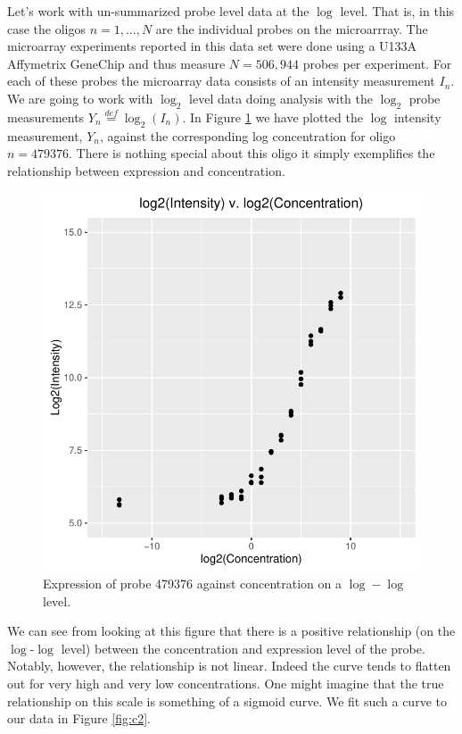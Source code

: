 \documentclass[reqno,12pt,oneside]{report}\usepackage[]{graphicx}\usepackage[]{color}
\makeatletter
\def\maxwidth{ %
  \ifdim\Gin@nat@width>\linewidth
    \linewidth
  \else
    \Gin@nat@width
  \fi
}
\newenvironment{knitrout}{}{} %
\renewenvironment{knitrout}{\begin{small}}{\end{small}}
\theoremstyle{plain}
\theoremstyle{definition}
\theoremstyle{remark}
\numberwithin{theorem}{chapter}     %
\makeatother
\begin{document}
Let's work with un-summarized probe level data at the $\log$ level. That is, in this case the oligos $n=1,\ldots,N$ are the individual probes on the microarrray. The microarray experiments reported in this data set were done using a U133A Affymetrix GeneChip and thus measure $N=506,944$ probes per experiment. For each of these probes the microarray data consists of an intensity measurement $I_n$. We are going to work with $\log_2$ level data doing analysis with the $\log_2$ probe measurements $Y_n \overset{def}{=} \log_2(I_n)$. In Figure \ref{fig:c1} we have plotted the $\log$ intensity measurement, $Y_n$, against the corresponding log concentration for oligo $n=479376$. There is nothing special about this oligo it simply exemplifies the relationship between expression and concentration. 

\begin{figure}[ht]
  \centering
\begin{knitrout}
\color{fgcolor}
\includegraphics[width=\maxwidth]{figure/chap4-fig1-1} 

\end{knitrout}
\caption{Expression of probe 479376 against concentration on a $\log-\log$ level.}
  \label{fig:c1}
\end{figure}

We can see from looking at this figure that there is a positive relationship (on the $\log$-$\log$ level) between the concentration and expression level of the probe. Notably, however, the relationship is not linear. Indeed the curve tends to flatten out for very high and very low concentrations. One might imagine that the true relationship on this scale is something of a sigmoid curve. We fit such a curve to our data in Figure \ref{fig:c2}.
\end{document}
